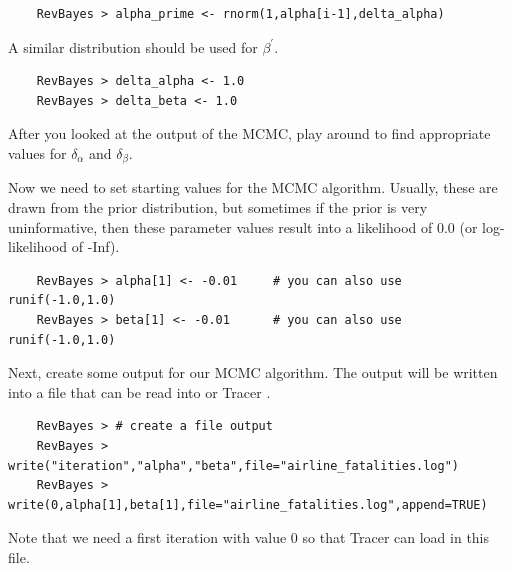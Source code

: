 {\tt \begin{snugshade*}
\begin{lstlisting}    
    RevBayes > alpha_prime <- rnorm(1,alpha[i-1],delta_alpha)
\end{lstlisting}
\end{snugshade*}}
A similar distribution should be used for $\beta^{\prime}$. 
{\tt \begin{snugshade*}
\begin{lstlisting}    
    RevBayes > delta_alpha <- 1.0
    RevBayes > delta_beta <- 1.0
\end{lstlisting}
\end{snugshade*}}
After you looked at the output of the MCMC, play around to find appropriate values for $\delta_{\alpha}$ and $\delta_{\beta}$.

Now we need to set starting values for the MCMC algorithm.
Usually, these are drawn from the prior distribution, but sometimes if the prior is very uninformative, then these parameter values result into a likelihood of 0.0 (or log-likelihood of -Inf).
{\tt \begin{snugshade*}
\begin{lstlisting}    
    RevBayes > alpha[1] <- -0.01     # you can also use runif(-1.0,1.0)
    RevBayes > beta[1] <- -0.01      # you can also use runif(-1.0,1.0)
\end{lstlisting}
\end{snugshade*}}
Next, create some output for our MCMC algorithm.
The output will be written into a file that can be read into \R or Tracer \citep{rambaut09}.
{\tt \begin{snugshade*}
\begin{lstlisting}    
    RevBayes > # create a file output
    RevBayes > write("iteration","alpha","beta",file="airline_fatalities.log")
    RevBayes > write(0,alpha[1],beta[1],file="airline_fatalities.log",append=TRUE)
\end{lstlisting}
\end{snugshade*}}
Note that we need a first iteration with value 0 so that Tracer can load in this file.

